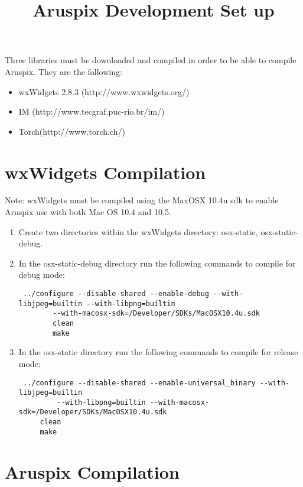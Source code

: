 \documentclass[]{article}
\title{Aruspix Development Set up}
\author{  }
\begin{document}
\ifpdf
{}
\else
{}
\fi

\maketitle

Three libraries must be downloaded and compiled in order to be able to compile Aruspix. 
They are the following:
\begin{itemize}
\item wxWidgets 2.8.3 (http://www.wxwidgets.org/)
\item IM (http://www.tecgraf.puc-rio.br/im/) 
\item Torch(http://www.torch.ch/)
\end{itemize}

\section{wxWidgets Compilation}
	
Note: wxWidgets must be compiled using the MaxOSX 10.4u sdk to enable Aruspix use with both Mac OS 10.4 and 10.5.
\begin{enumerate}
	\item Create two directories within the wxWidgets directory: osx-static, osx-static-debug.
	\item In the osx-static-debug directory run the following commands to compile for debug mode:
	\begin{verbatim} ../configure --disable-shared --enable-debug --with-libjpeg=builtin --with-libpng=builtin 
     	--with-macosx-sdk=/Developer/SDKs/MacOSX10.4u.sdk
 		clean
 		make
	\end{verbatim}

	\item In the osx-static directory run the following commands to compile for release mode:
	\begin{verbatim} ../configure --disable-shared --enable-universal_binary --with-libjpeg=builtin
	     --with-libpng=builtin --with-macosx-sdk=/Developer/SDKs/MacOSX10.4u.sdk 
	 clean
	 make
	\end{verbatim}
\end{enumerate}

\section{Aruspix Compilation}
\end{document}

